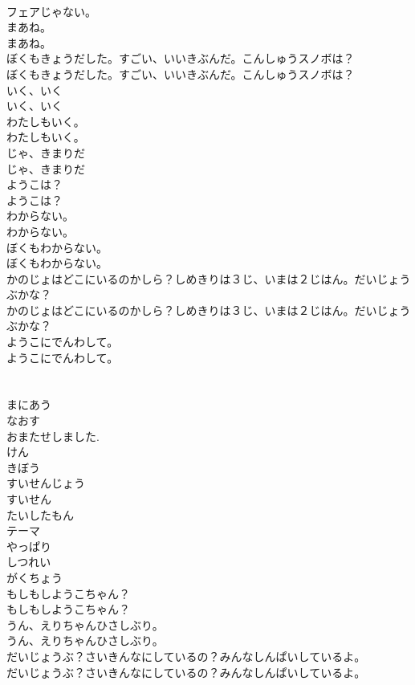 \documentclass[8pt]{extreport}
\begin{document}
\begin{CJK}{UTF8}{min}
\\	フェアじゃない。
\\	まあね。
\\	まあね。
\\	ぼくもきょうだした。すごい、いいきぶんだ。こんしゅうスノボは？
\\	ぼくもきょうだした。すごい、いいきぶんだ。こんしゅうスノボは？
\\	いく、いく
\\	いく、いく
\\	わたしもいく。
\\	わたしもいく。
\\	じゃ、きまりだ
\\	じゃ、きまりだ
\\	ようこは？
\\	ようこは？
\\	わからない。
\\	わからない。
\\	ぼくもわからない。
\\	ぼくもわからない。
\\	かのじょはどこにいるのかしら？しめきりは３じ、いまは２じはん。だいじょうぶかな？
\\	かのじょはどこにいるのかしら？しめきりは３じ、いまは２じはん。だいじょうぶかな？
\\	ようこにでんわして。
\\	ようこにでんわして。
\\	[でんわをかける・・・]
\\	[でんわをかける・・・]
\\	まにあう
\\	なおす
\\	おまたせしました.
\\	けん
\\	きぼう
\\	すいせんじょう
\\	すいせん
\\	たいしたもん
\\	テーマ
\\	やっぱり
\\	しつれい
\\	がくちょう
\\	もしもしようこちゃん？
\\	もしもしようこちゃん？
\\	うん、えりちゃんひさしぶり。
\\	うん、えりちゃんひさしぶり。
\\	だいじょうぶ？さいきんなにしているの？みんなしんぱいしているよ。
\\	だいじょうぶ？さいきんなにしているの？みんなしんぱいしているよ。

\end{CJK}
\end{document}
